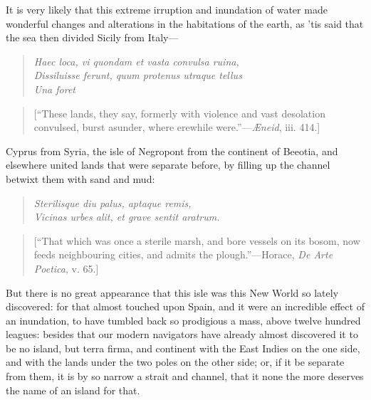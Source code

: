 \documentclass[twocolumn]{article}
\begin{document}
	It is very likely that this extreme irruption and inundation of water made wonderful changes and alterations in the habitations of the earth, as ’tis said that the sea then divided Sicily from Italy---\thispagestyle{second}

	\begin{quote}
		\noindent\emph{Haec loca, vi quondam et vasta convulsa ruina,}\\
		\emph{Dissiluisse ferunt, quum protenus utraque tellus}\\
		\emph{Una foret}
	\end{quote}
		
	\begin{quote}
		[``These lands, they say, formerly with violence and vast desolation convulsed, burst asunder, where erewhile were.''---\emph{\AE{}neid}, iii. 414.]
	\end{quote}
	
	Cyprus from Syria, the isle of Negropont from the continent of Beeotia, and elsewhere united lands that were separate before, by filling up the channel betwixt them with sand and mud:

	\begin{quote}
		\noindent\emph{Sterilisque diu palus, aptaque remis,}\\ 
		\emph{Vicinas urbes alit, et grave sentit aratrum.}\end{quote}
	
	\begin{quote}
		[``That which was once a sterile marsh, and bore vessels on its bosom, now feeds neighbouring cities, and admits the plough.''---Horace, \emph{De Arte Poetica}, v. 65.]
	\end{quote}
	
	But there is no great appearance that this isle was this New World so lately discovered: for that almost touched upon Spain, and it were an incredible effect of an inundation, to have tumbled back so prodigious a mass, above twelve hundred leagues: besides that our modern navigators have already almost discovered it to be no island, but terra firma, and continent with the East Indies on the one side, and with the lands under the two poles on the other side; or, if it be separate from them, it is by so narrow a strait and channel, that it none the more deserves the name of an island for that.
\end{document}
